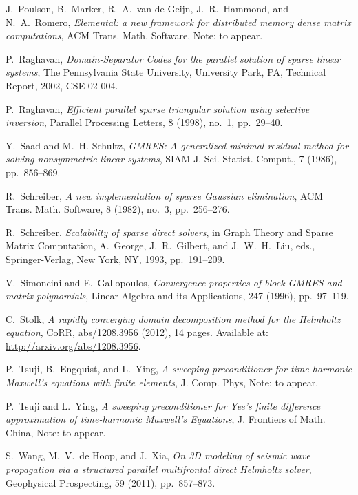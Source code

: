 \begin{thebibliography}{10}
{\sc J.~Poulson, B.~Marker, R.~A.~van de Geijn, J.~R.~Hammond, and 
 N.~A.~Romero}, 
{\em Elemental: a new framework for distributed memory dense matrix 
 computations}, 
ACM Trans. Math. Software, Note: to appear.

{\sc P.~Raghavan},
{\em Domain-Separator Codes for the parallel solution of sparse linear systems},
The Pennsylvania State University, University Park, PA, 
Technical Report, 2002, CSE-02-004.

{\sc P.~Raghavan},
{\em Efficient parallel sparse triangular solution using selective inversion},
Parallel Processing Letters, 8 (1998), no.~1, pp.~29--40.

{\sc Y.~Saad and M.~H. Schultz}, 
{\em {\rm GMRES}: A generalized minimal residual method for solving nonsymmetric linear systems}, 
SIAM J. Sci. Statist. Comput., 7 (1986), pp.~856--869.

{\sc R.~Schreiber},
{\em A new implementation of sparse Gaussian elimination},
ACM Trans. Math. Software, 8 (1982), no.~3, pp.~256--276.

{\sc R.~Schreiber},
{\em Scalability of sparse direct solvers},
in Graph Theory and Sparse Matrix Computation, A.~George, J.~R.~Gilbert, and 
J.~W.~H.~Liu, eds., Springer-Verlag, New York, NY, 1993, pp.~191--209.

{\sc V.~Simoncini and E.~Gallopoulos},
{\em Convergence properties of block GMRES and matrix polynomials},
Linear Algebra and its Applications, 247 (1996), pp.~97--119.

{\sc C.~Stolk},
{\em A rapidly converging domain decomposition method for the Helmholtz 
     equation},
CoRR, abs/1208.3956 (2012), 14 pages. Available at:
\url{http://arxiv.org/abs/1208.3956}.

{\sc P.~Tsuji, B.~Engquist, and L.~Ying},
{\em A sweeping preconditioner for time-harmonic Maxwell's equations with 
 finite elements},
J. Comp. Phys, Note: to appear.

{\sc P.~Tsuji and L.~Ying},
{\em A sweeping preconditioner for Yee's finite difference approximation of 
 time-harmonic Maxwell's Equations},
J. Frontiers of Math. China, Note: to appear.

{\sc S.~Wang, M.~V.~de Hoop, and J.~Xia},
{\em On 3D modeling of seismic wave propagation via a structured parallel 
 multifrontal direct Helmholtz solver},
Geophysical Prospecting, 59 (2011), pp.~857--873.


\end{thebibliography}
